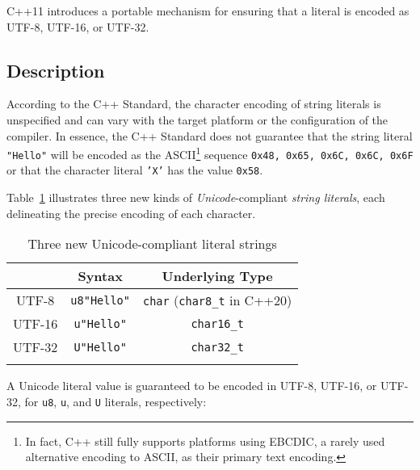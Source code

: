 
C++11 introduces a portable mechanism for ensuring that a literal is
encoded as UTF-8, UTF-16, or UTF-32.

\subsection[Description]{Description}\label{description-unicodestring}

According to the C++ Standard, the character encoding of string literals
is unspecified and can vary with the target platform or the configuration of
the compiler. In essence, the C++ Standard does not guarantee that the
string literal \texttt{"Hello"} will be encoded as the
ASCII{\cprotect\footnote{In fact, C++ still fully supports platforms
  using EBCDIC, a rarely used alternative encoding to ASCII, as their primary text encoding.}} sequence
\texttt{{0x48,} \texttt{0x65,} \texttt{0x6C,} \texttt{0x6C,} \texttt{0x6F}}
or that the character literal \texttt{'X'} has the value
\texttt{0x58}.

Table~\ref{unicodestring-table1} illustrates three new kinds of \emph{Unicode}-compliant
\emph{string literals}, each delineating the precise encoding of each
character.
 \begin{table}[h!]
\begin{center}
\begin{threeparttable}
\caption{Three new Unicode-compliant literal strings}\label{unicodestring-table1}\vspace{1.5ex}
{\small \begin{tabular}{c|c|c}\thickhline
\rowcolor[gray]{.9}{\sffamily\bfseries Encoding} & {\sffamily\bfseries Syntax} & {\sffamily\bfseries Underlying Type}\\ \hline
UTF-8   &  \texttt{u8"Hello"} & \texttt{char} (\texttt{char8\_t} in C++20) \\ \hline
UTF-16 & \texttt{u"Hello"}  & \texttt{char16\_t} \\ \hline
UTF-32  & \texttt{U"Hello"} & \texttt{char32\_t}\\ \thickhline
\end{tabular}
} %
\end{threeparttable}
\end{center}
\end{table}

\noindent A Unicode literal value is guaranteed to be encoded in UTF-8, UTF-16, or
UTF-32, for \texttt{u8}, \texttt{u}, and \texttt{U} literals,
respectively:

